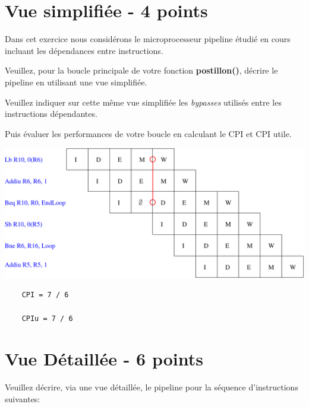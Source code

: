 {\begin{correction}
\end{correction}

%
%

\section{Vue simplifi\'ee - 4 points}

Dans cet exercice nous consid\'erons le microprocesseur pipeline \'etudi\'e
en cours incluant les d\'ependances entre instructions.

Veuillez, pour la boucle principale de votre fonction \textbf{postillon()},
d\'ecrire le pipeline en utilisant une vue simplifi\'ee.

Veuillez indiquer sur cette m\^eme vue simplifi\'ee les \textit{bypasses}
utilis\'es entre les instructions d\'ependantes.

Puis \'evaluer les performances de votre boucle en calculant le CPI et CPI
utile.

\begin{correction}

  \begin{center}
    \includegraphics[scale=0.8]{figures/correction-vue-simplifiee.pdf}
  \end{center}

  \begin{verbatim}
    CPI = 7 / 6

    CPIu = 7 / 6
  \end{verbatim}

\end{correction}

%
%

\section{Vue D\'etaill\'ee - 6 points}

Veuillez d\'ecrire, via une vue d\'etaill\'ee, le pipeline pour la s\'equence
d'instructions suivantes:

}
